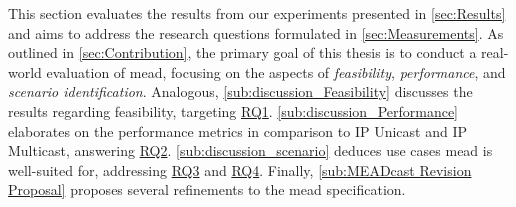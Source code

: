This section evaluates the results from our experiments presented in
    \autoref{sec:Results} and aims to address the research questions
    formulated in \autoref{sec:Measurements}.
As outlined in \autoref{sec:Contribution}, the primary goal of this thesis is
    to conduct a real-world evaluation of \gls{mead}, focusing on the aspects of
    \textit{feasibility}, \textit{performance}, and \textit{scenario
    identification}.
Analogous, \autoref{sub:discussion_Feasibility} discusses the results regarding
    feasibility, targeting \hyperref[rq1]{RQ1}.
\autoref{sub:discussion_Performance} elaborates on the performance metrics
    in comparison to IP Unicast and IP Multicast, answering \hyperref[rq2]{RQ2}.
\autoref{sub:discussion_scenario} deduces use cases \gls{mead} is well-suited
    for, addressing \hyperref[rq3]{RQ3} and \hyperref[rq4]{RQ4}.
Finally, \autoref{sub:MEADcast Revision Proposal} proposes several refinements
    to the \gls{mead} specification.

